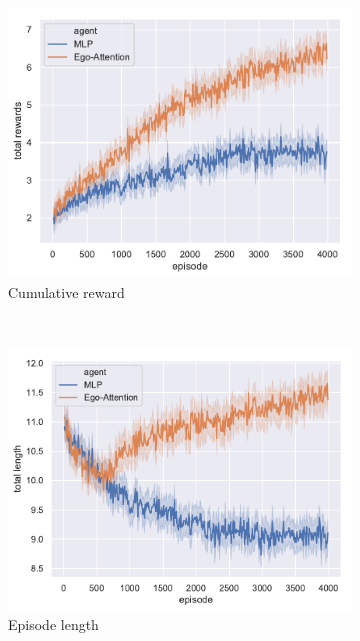 \documentclass{article}
\begin{document}
{\begin{figure}
	\centering
	\begin{subfigure}[t]{.65\linewidth}
		\centering\includegraphics[width=\linewidth]{img/total_rewards}
		\caption{Cumulative reward}
	\end{subfigure}
\\
	\begin{subfigure}[t]{.65\linewidth}
		\centering\includegraphics[width=\linewidth]{img/total_length}
		\caption{Episode length}
	\end{subfigure}
\\
	\begin{subfigure}[t]{.65\linewidth}

\end{subfigure}
\end{figure}}
\end{document}
